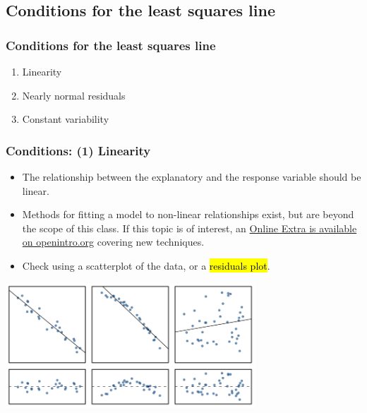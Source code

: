 
\subsection{Conditions for the least squares line}


\begin{frame}
\frametitle{Conditions for the least squares line}

\begin{enumerate}

\item Linearity

\pause

\item Nearly normal residuals

\pause

\item Constant variability

\end{enumerate}

\end{frame}


\begin{frame}
\frametitle{Conditions: (1) Linearity}

\begin{itemize}

\item The relationship between the explanatory and the response variable should be linear. 

\pause

\item Methods for fitting a model to non-linear relationships exist, but are beyond the scope of this class. If this topic is of interest, an \href{http://www.openintro.org/download.php?file=os2_extra_nonlinear_relationships&referrer=/stat/textbook.php}{Online Extra is available on openintro.org} covering new techniques.

\pause

\item Check using a scatterplot of the data, or a \hl{residuals plot}.

\end{itemize}

\begin{center}
\includegraphics[width=0.7\textwidth]{7-2_least_square_reg/figures/sampleLinesAndResPlots/sampleLinesAndResPlots}
\end{center}

\end{frame}

